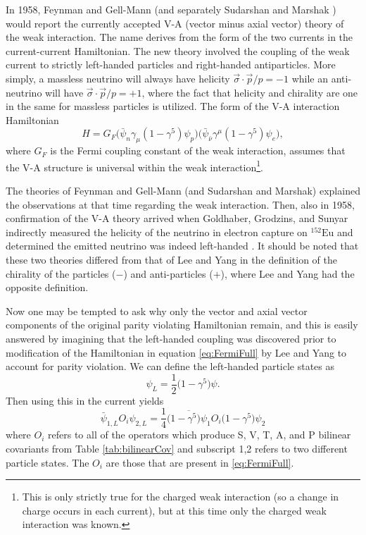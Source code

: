 In 1958, Feynman and Gell-Mann \cite{feynman1958} (and separately Sudarshan and Marshak
\cite{sudarshan1958}) would report the currently accepted V-A (vector minus axial vector)
theory of the weak interaction. The name derives from the form of the two currents in the
current-current Hamiltonian.
The new theory involved the coupling of the weak current to strictly left-handed particles and right-handed
antiparticles. More simply, a massless neutrino will always have helicity
$\vec{\sigma} \cdot \vec{p}/p = -1$ while an anti-neutrino will have $\vec{\sigma} \cdot \vec{p}/p = +1$,
where the fact that helicity and chirality are one in the same for massless particles is utilized.
The form of the V-A interaction Hamiltonian
%
\begin{equation}
  H = G_F \Big(\bar{\psi}_n \gamma_\mu(1-\gamma^5)\psi_p \Big)\Big(\bar{\psi}_{\bar{\nu}} \gamma^\mu(1-\gamma^5)\psi_e \Big),
  \label{eq:VminusA}
\end{equation}
%
where $G_F$ is the Fermi coupling constant of the weak interaction,
assumes that the V-A structure is universal within the weak interaction\footnote{This is
  only strictly true for the charged weak interaction (so a change in charge occurs in each current),
  but at this time only the charged weak interaction
  was known.}.

The theories of Feynman and Gell-Mann (and Sudarshan and Marshak)
explained the observations at that time
regarding the weak interaction. Then, also in 1958, confirmation of the V-A theory arrived when
Goldhaber, Grodzins, and Sunyar indirectly measured
the helicity of the neutrino in electron capture on $^{152}\mathrm{Eu}$ and determined the
emitted neutrino was indeed left-handed
\cite{goldhaber1958,greiner1996}. It should be noted that these two theories differed from that of
Lee and Yang in the definition of the chirality of the particles ($-$) and anti-particles ($+$), where
Lee and Yang had the opposite definition.

Now one may be tempted to ask why only the vector and axial vector components of the original
parity violating Hamiltonian remain, and this is easily answered by imagining that the
left-handed coupling was discovered prior to modification of the Hamiltonian in equation
\ref{eq:FermiFull} by Lee and Yang to account for parity violation. We can define the left-handed
particle states as 
%
\begin{equation}
  \psi_L = \frac{1}{2}\big(1-\gamma^5\big)\psi.
\end{equation}
%
Then using this in the current yields
%
\begin{equation}
  \bar{\psi}_{1,L} O_i \psi_{2,L} = \frac{1}{4}\overline{\big(1-\gamma^5\big)\psi_{1}} O_i \big(1-\gamma^5\big)\psi_{2}
\end{equation}
%
where $O_i$ refers to all of the operators which produce S, V, T, A, and P bilinear covariants
from Table \ref{tab:bilinearCov} and subscript 1,2 refers to two different particle states.
The $O_i$ are those that are present in \ref{eq:FermiFull}.


